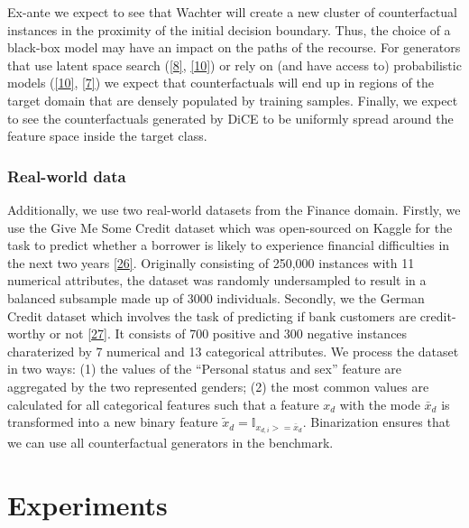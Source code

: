 \documentclass[
  conference]{IEEEtran}
\begin{document}
Ex-ante we expect to see that Wachter will create a new cluster of
counterfactual instances in the proximity of the initial decision
boundary. Thus, the choice of a black-box model may have an impact on
the paths of the recourse. For generators that use latent space search
(\protect\hyperlink{ref-joshi2019towards}{{[}8{]}},
\protect\hyperlink{ref-antoran2020getting}{{[}10{]}}) or rely on (and
have access to) probabilistic models
(\protect\hyperlink{ref-antoran2020getting}{{[}10{]}},
\protect\hyperlink{ref-schut2021generating}{{[}7{]}}) we expect that
counterfactuals will end up in regions of the target domain that are
densely populated by training samples. Finally, we expect to see the
counterfactuals generated by DiCE to be uniformly spread around the
feature space inside the target class.

\hypertarget{real-world-data}{%
\subsubsection{Real-world data}\label{real-world-data}}

Additionally, we use two real-world datasets from the Finance domain.
Firstly, we use the Give Me Some Credit dataset which was open-sourced
on Kaggle for the task to predict whether a borrower is likely to
experience financial difficulties in the next two years
\protect\hyperlink{ref-gmsc_data}{{[}26{]}}. Originally consisting of
250,000 instances with 11 numerical attributes, the dataset was randomly
undersampled to result in a balanced subsample made up of 3000
individuals. Secondly, we the German Credit dataset which involves the
task of predicting if bank customers are credit-worthy or not
\protect\hyperlink{ref-germancredit1994}{{[}27{]}}. It consists of 700
positive and 300 negative instances charaterized by 7 numerical and 13
categorical attributes. We process the dataset in two ways: (1) the
values of the ``Personal status and sex'' feature are aggregated by the
two represented genders; (2) the most common values are calculated for
all categorical features such that a feature \(x_d\) with the mode
\(\bar{x}_d\) is transformed into a new binary feature
\(\tilde{x}_d=\mathbb{I}_{x_{d,i}>=\bar{x}_d}\). Binarization ensures
that we can use all counterfactual generators in the benchmark.

\hypertarget{sec-empirical-2}{%
\section{Experiments}\label{sec-empirical-2}}
\end{document}

